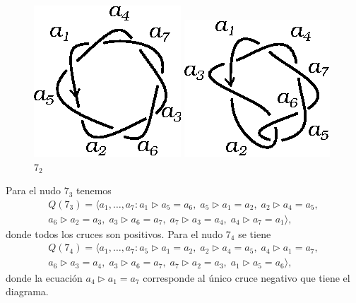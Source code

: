 \documentclass[graybox]{svmult}
\begin{document}
	\begin{figure}[ht]
		\centering
		\begin{minipage}{0.4\textwidth}
			\centering
			\includegraphics[scale=0.7]{images/7_1}
			\caption{$7_1$}
			\label{fig:7_1}

		\end{minipage}
		\begin{minipage}{0.4\textwidth}
			\centering
			\includegraphics[scale=0.7]{images/7_2}
			\caption{$7_2$}
			\label{fig:7_2}

 		\end{minipage}
 	\end{figure}


	Para el nudo $7_3$ tenemos
	\begin{multline}
		Q(7_3)=\langle a_1,\dots,a_7:
		a_1\triangleright a_5=a_6,\;
		a_5\triangleright a_1=a_2,\;
		a_2\triangleright a_4=a_5,\\
		a_6\triangleright a_2=a_3,\;
		a_3\triangleright a_6=a_7,\;
		a_7\triangleright a_3=a_4,\;
		a_4\triangleright a_7=a_1\rangle,
	\end{multline}
    donde todos los cruces son positivos. 
    Para el nudo $7_4$ se tiene
	\begin{multline}
		Q(7_4)=\langle a_1,\dots,a_7:
		a_5\triangleright a_1=a_2,\;
		a_2\triangleright a_4=a_5,\;
		a_4\triangleright a_1=a_7,\\
		a_6\triangleright a_3=a_4,\;
		a_3\triangleright a_6=a_7,\;
		a_7\triangleright a_2=a_3,\;
		a_1\triangleright a_5=a_6\rangle,
	\end{multline}
    donde la ecuación $a_4\triangleright a_1=a_7$ corresponde al único cruce
    negativo que tiene el diagrama. 
	
\end{document}
